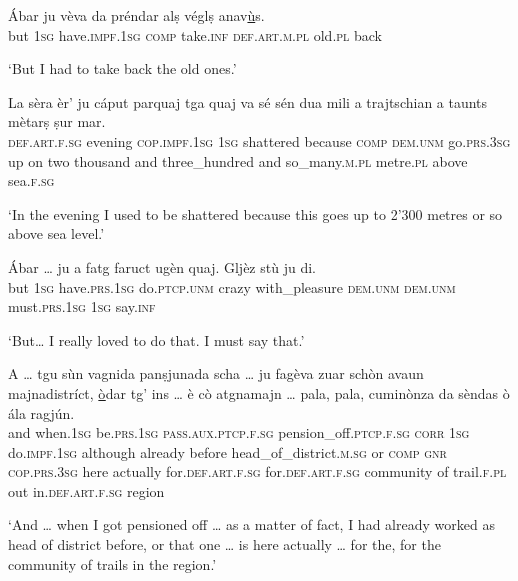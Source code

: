 \begin{linenumbers}
\gll Ábar ju vèva da préndar alṣ véglṣ anav\underline{ù}s.   \\
but \textsc{1sg} have.\textsc{impf.1sg} \textsc{comp} take.\textsc{inf} \textsc{def.art.m.pl} old.\textsc{pl} back \\
\end{linenumbers}
\medskip
\glt `But I had to take back the old ones.'
\medskip

\begin{linenumbers}
\gll  La sèra èr’ ju cáput parquaj tga quaj va sé sén dua mili a trajtschian a taunts mètarṣ ṣur mar. \\
 \textsc{def.art.f.sg} evening \textsc{cop.impf.1sg} \textsc{1sg} shattered because \textsc{comp} \textsc{dem.unm} go.\textsc{prs.3sg} up on two thousand and three\_hundred and  so\_many.\textsc{m.pl} metre.\textsc{pl} above sea.\textsc{f.sg}\\
\end{linenumbers}
\medskip
\glt `In the evening I used to be shattered because this goes up to 2'300 metres or so above sea level.'
\medskip

\begin{linenumbers}
\gll  Ábar … ju a fatg faruct ugèn quaj. Gljèz stù ju di.  \\
but {} \textsc{1sg} have.\textsc{prs.1sg} do.\textsc{ptcp.unm} crazy with\_pleasure \textsc{dem.unm} \textsc{dem.unm} must.\textsc{prs.1sg} \textsc{1sg} say.\textsc{inf}\\ 
\end{linenumbers}
\medskip
\glt `But… I really loved to do that. I must say that.'
\medskip

\begin{linenumbers}
\gll  A … tgu sùn vagnida panṣjunada scha … ju fagèva zuar schòn avaun majnadistríct, \underline{ò}dar tg’ ins … è cò atgnamajn … pala, pala, cuminònza da sèndas ò ála ragjún.  \\
and {} when.\textsc{1sg} be.\textsc{prs.1sg} \textsc{pass.aux.ptcp.f.sg} pension\_off.\textsc{ptcp.f.sg} \textsc{corr} {} \textsc{1sg} do.\textsc{impf.1sg} although already before head\_of\_district.\textsc{m.sg} or \textsc{comp} \textsc{gnr} {} \textsc{cop.prs.3sg} here actually {} for.\textsc{def.art.f.sg} for.\textsc{def.art.f.sg} community of trail.\textsc{f.pl} out in.\textsc{def.art.f.sg} region\\
\end{linenumbers}
\medskip
\glt `And … when I got pensioned off … as a matter of fact, I had already worked as head of district before, or that one … is here actually … for the, for the community of trails in the region.'
\medskip
 

